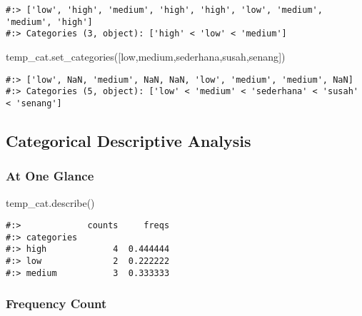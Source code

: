 \documentclass[
]{book}
\newenvironment{Shaded}{\begin{snugshade}}{\end{snugshade}}
\newcommand{\NormalTok}[1]{#1}
\newcommand{\StringTok}[1]{\textcolor[rgb]{0.5,0.5,0.5}{#1}}
\begin{document}
\begin{verbatim}
#:> ['low', 'high', 'medium', 'high', 'high', 'low', 'medium', 'medium', 'high']
#:> Categories (3, object): ['high' < 'low' < 'medium']
\end{verbatim}

\begin{Shaded}
\begin{Highlighting}[]
\NormalTok{temp\_cat.set\_categories([}\StringTok{\textquotesingle{}low\textquotesingle{}}\NormalTok{,}\StringTok{\textquotesingle{}medium\textquotesingle{}}\NormalTok{,}\StringTok{\textquotesingle{}sederhana\textquotesingle{}}\NormalTok{,}\StringTok{\textquotesingle{}susah\textquotesingle{}}\NormalTok{,}\StringTok{\textquotesingle{}senang\textquotesingle{}}\NormalTok{])}
\end{Highlighting}
\end{Shaded}

\begin{verbatim}
#:> ['low', NaN, 'medium', NaN, NaN, 'low', 'medium', 'medium', NaN]
#:> Categories (5, object): ['low' < 'medium' < 'sederhana' < 'susah' < 'senang']
\end{verbatim}

\hypertarget{categorical-descriptive-analysis}{%
\subsection{Categorical Descriptive Analysis}\label{categorical-descriptive-analysis}}

\hypertarget{at-one-glance}{%
\subsubsection{At One Glance}\label{at-one-glance}}

\begin{Shaded}
\begin{Highlighting}[]
\NormalTok{temp\_cat.describe()}
\end{Highlighting}
\end{Shaded}

\begin{verbatim}
#:>             counts     freqs
#:> categories                  
#:> high             4  0.444444
#:> low              2  0.222222
#:> medium           3  0.333333
\end{verbatim}

\hypertarget{frequency-count}{%
\subsubsection{Frequency Count}\label{frequency-count}}
\end{document}
